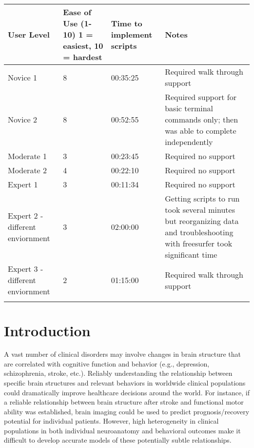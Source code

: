 \documentclass[twocolumn]{bmcart}%
\begin{document}
\begin{table*}
\begin{tabular*}{\textwidth}{p{3cm}p{2cm}p{4cm}p{6cm}}
  User Level  & Ease of Use (1-10) 1 = easiest, 10 = hardest & Time to implement scripts & Notes \\
    \hline\noalign{\smallskip}
  Novice 1     &     8     &     00:35:25     &     Required walk through support   \\
  Novice 2     &     8     &     00:52:55     &     Required support for basic terminal commands only; then was able to complete independently   \\
  Moderate 1     &     3     &     00:23:45     &     Required no support   \\
  Moderate 2     &     4     &     00:22:10     &     Required no support   \\
  Expert 1     &     3     &     00:11:34     &     Required no support   \\
  Expert 2 - different enviornment     &     3     &     02:00:00     &     Getting scripts to run took several minutes but reorganizing data and troubleshooting with freesurfer took significant time   \\ 
  Expert 3 - different enviornment     &     2     &     01:15:00     &     Required walk through support   \\ 
  \noalign{\smallskip}\hline
\end{tabular*}
\end{table*}

\section{Introduction}\label{introduction}

A vast number of clinical disorders may involve changes in brain
structure that are correlated with cognitive function and behavior
(e.g., depression, schizophrenia, stroke, etc.). Reliably understanding
the relationship between specific brain structures and relevant
behaviors in worldwide clinical populations could dramatically improve
healthcare decisions around the world. For instance, if a reliable
relationship between brain structure after stroke and functional motor
ability was established, brain imaging could be used to predict
prognosis/recovery potential for individual patients. However, high
heterogeneity in clinical populations in both individual neuroanatomy
and behavioral outcomes make it difficult to develop accurate models of
these potentially subtle relationships.
\end{document}
